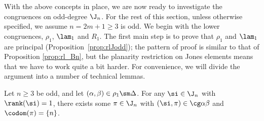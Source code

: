 With the above concepts in place, we are now ready to investigate the congruences on odd-degree $\J_n$.
%
For the rest of this section, unless otherwise specified, we assume $n=2m+1\geq3$ is odd.  
%
We begin with the lower congruences, $\rho_1$, $\lam_1$ and $R_1$.  The first main step is to prove that $\rho_1$ and $\lam_1$ are principal (Proposition~\ref{prop:rlJodd}); the pattern of proof is similar to that of Proposition \ref{prop:rl_Bn}, but the planarity restriction on Jones elements means that we have to work quite a bit harder.  For convenience, we will divide the argument into a number of technical lemmas.


\begin{lemma}\label{lem:bzn}
Let $n\geq3$ be odd, and let $(\alpha,\beta)\in\rho_1\sm\Delta$.  For any $\si\in\J_n$ with $\rank(\si)=1$, there exists some $\pi\in\J_n$ with $(\si,\pi)\in\cg\alpha\beta$ and $\codom(\pi)=\{n\}$.
\end{lemma}


